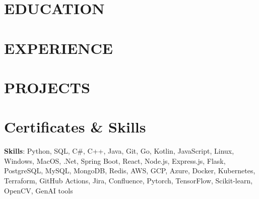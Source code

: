\documentclass[10pt, letterpaper]{article}
\begin{document}
    \newcommand{\AND}{\unskip
        \cleaders\copy\ANDbox\hskip\wd\ANDbox
        \ignorespaces
    }
    \newsavebox\ANDbox
    \sbox\ANDbox{$|$}
    
    \begin{header}
        \normalsize
    \end{header}

    \vspace{5 pt - 0.3 cm}

\section{EDUCATION}

\vspace{0.2 cm}
\section{EXPERIENCE}

\vspace{0.1 cm}

\vspace{0.1 cm}

\vspace{0.1 cm}

\vspace{0.2 cm}
\section{PROJECTS}

\vspace{0.1 cm}

\vspace{0.1 cm}

\vspace{0.1 cm}

\vspace{0.1 cm}

\vspace{0.1 cm}

\vspace{0.2 cm}
\section{Certificates \& Skills}

\textbf{Skills}: Python, SQL, C\#, C++, Java, Git, Go, Kotlin, JavaScript,
Linux, Windows, MacOS,
.Net, Spring Boot, React, Node.js, Express.js, Flask,
PostgreSQL, MySQL, MongoDB, Redis,
AWS, GCP, Azure, Docker, Kubernetes, Terraform, GitHub Actions,
Jira, Confluence, 
Pytorch, TensorFlow, Scikit-learn, OpenCV, GenAI tools
\end{document}

